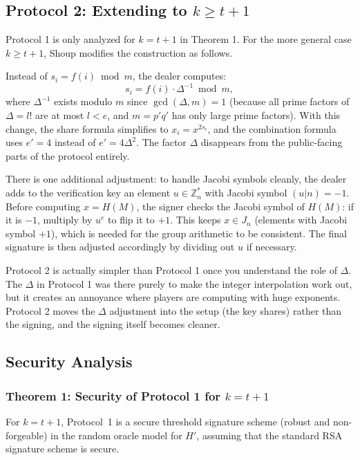 \subsection{Protocol 2: Extending to $k \geq t + 1$}

Protocol 1 is only analyzed for $k = t + 1$ in Theorem 1. For the more general case
$k \geq t + 1$, Shoup modifies the construction as follows.

Instead of $s_i = f(i) \bmod m$, the dealer computes:
\[
    s_i = f(i) \cdot \Delta^{-1} \bmod m,
\]
where $\Delta^{-1}$ exists modulo $m$ since $\gcd(\Delta, m) = 1$ (because all prime
factors of $\Delta = l!$ are at most $l < e$, and $m = p'q'$ has only large prime
factors). With this change, the share formula simplifies to $x_i = x^{2s_i}$, and the
combination formula uses $e' = 4$ instead of $e' = 4\Delta^2$. The factor $\Delta$
disappears from the public-facing parts of the protocol entirely.

There is one additional adjustment: to handle Jacobi symbols cleanly, the dealer adds to
the verification key an element $u \in \mathbb{Z}_n^*$ with Jacobi symbol $(u|n) = -1$.
Before computing $x = H(M)$, the signer checks the Jacobi symbol of $H(M)$: if it is
$-1$, multiply by $u^e$ to flip it to $+1$. This keeps $x \in J_n$ (elements with
Jacobi symbol $+1$), which is needed for the group arithmetic to be consistent. The final
signature is then adjusted accordingly by dividing out $u$ if necessary.

Protocol 2 is actually simpler than Protocol 1 once you understand the role of $\Delta$.
The $\Delta$ in Protocol 1 was there purely to make the integer interpolation work out,
but it creates an annoyance where players are computing with huge exponents. Protocol 2
moves the $\Delta$ adjustment into the setup (the key shares) rather than the signing,
and the signing itself becomes cleaner.

\subsection{Security Analysis}

\subsubsection{Theorem 1: Security of Protocol 1 for $k = t + 1$}

\begin{theorem}
For $k = t + 1$, Protocol~1 is a secure threshold signature scheme (robust and
non-forgeable) in the random oracle model for $H'$, assuming that the standard RSA
signature scheme is secure.
\end{theorem}

